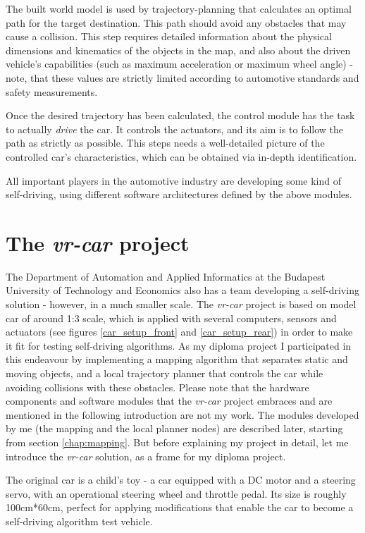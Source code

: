The built world model is used by trajectory-planning that calculates an optimal path for the target destination. This path should avoid any obstacles that may cause a collision. This step requires detailed information about the physical dimensions and kinematics of the objects in the map, and also about the driven vehicle's capabilities (such as maximum acceleration or maximum wheel angle) - note, that these values are strictly limited according to automotive standards and safety measurements.

Once the desired trajectory has been calculated, the control module has the task to actually \textit{drive} the car. It controls the actuators, and its aim is to follow the path as strictly as possible. This steps needs a well-detailed picture of the controlled car's characteristics, which can be obtained via in-depth identification.

All important players in the automotive industry are developing some kind of self-driving, using different software architectures defined by the above modules.

\section{The \textit{vr-car} project}
The Department of Automation and Applied Informatics at the Budapest University of Technology and Economics also has a team developing a self-driving solution - however, in a much smaller scale. The \textit{vr-car} project is based on model car of around 1:3 scale, which is applied with several computers, sensors and actuators (see figures \ref{car_setup_front} and \ref{car_setup_rear}) in order to make it fit for testing self-driving algorithms. As my diploma project I participated in this endeavour by implementing a mapping algorithm that separates static and moving objects, and a local trajectory planner that controls the car while avoiding collisions with these obstacles. Please note that the hardware components and software modules that the \textit{vr-car} project embraces and are mentioned in the following introduction are not my work. The modules developed by me (the mapping and the local planner nodes) are described later, starting from section \ref{chap:mapping}. But before explaining my project in detail, let me introduce the \textit{vr-car} solution, as a frame for my diploma project.

The original car is a child's toy - a car equipped with a DC motor and a steering servo, with an operational steering wheel and throttle pedal. Its size is roughly 100cm*60cm, perfect for applying modifications that enable the car to become a self-driving algorithm test vehicle.

